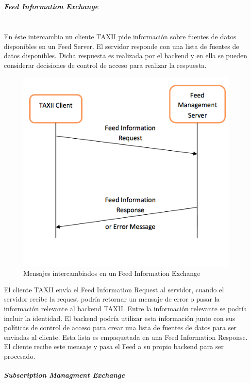 \subparagraph{Feed Information Exchange}\ \\

En éste intercambio un cliente TAXII pide información sobre fuentes de datos disponibles en 
un Feed Server. El servidor responde con una lista de fuentes de datos 
disponibles. Dicha respuesta es realizada por el backend y en ella se pueden considerar 
decisiones de control de acceso para realizar la respuesta.\\

\begin{figure}[ht!]
  \centering
    \includegraphics[width=150mm]{./images/FeedInformationExchange.png}
    \caption{Mensajes intercambiados en un Feed Information Exchange \protect\cite{b1}}
\end{figure}

El cliente TAXII envía el Feed Information Request al 
servidor, cuando el servidor recibe la request podría retornar un mensaje de 
error o pasar la información relevante al backend TAXII. Entre la información 
relevante se podría incluir la identidad. El backend podría utilizar esta 
información junto con sus políticas de control de acceso para crear una lista de 
fuentes de datos para ser enviadas al cliente. Esta lista es empaquetada en una 
Feed Information Response. El cliente recibe este mensaje y pasa el Feed a su 
propio backend para ser procesado.

\subparagraph{Subscription Managment Exchange}\ \\

